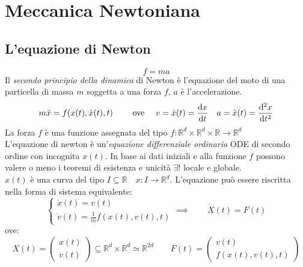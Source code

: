 \section{Meccanica Newtoniana}
\subsection{L'equazione di Newton}
\begin{equation}
    f = m a 
\end{equation}
Il \textit{secondo principio della dinamica} di Newton è l'equazione del moto di una particella di massa $m$ 
soggetta a una forza $f$, $a$ è l'accelerazione.\\ 
\begin{equation}
    m \ddot{x} = f( x(t),\dot{x}(t), t) \qquad \text{ ove } \quad v = \dot{x}(t) = \dv{x}{t}\quad a = \ddot{x}(t)= \dv[2]{x}{t}
\end{equation}
La forza $f$ è una funzione assegnata del tipo $f: \mathbb{R}^d\times \mathbb{R}^d \times \mathbb{R} \rightarrow \mathbb{R}^d$\\
L'equazione di newton è un'\textit{equazione differenziale ordinaria} ODE di secondo ordine con incognita $x(t)$. 
In base ai dati iniziali e alla funzione $f$ possono valere o meno i teoremi di esistenza e unicità $\exists!$ locale e globale.\\ 
$x(t)$ è una curva del tipo $I \subseteq \mathbb{R}\quad x: I \rightarrow \mathbb{R}^d $. L'equazione può essere 
riscritta nella forma di sistema equivalente:
\begin{equation}
    \begin{cases}
        \dot{x}(t) = v(t)\\ 
        \dot{v}(t) =\frac{1}{m} f( x(t), v(t), t)
    \end{cases}
    \implies
    \qquad
    \dot{X}(t)= F(t)
\end{equation}
ove:
\begin{equation*}
    X (t) = \begin{pmatrix}
        x (t) \\ 
        v (t)
    \end{pmatrix} \subseteq \mathbb{R}^d \times \mathbb{R}^d \simeq \mathbb{R}^{2d} \qquad
    F (t) = \begin{pmatrix}
        v(t) \\
        f(x(t), v(t),t)
    \end{pmatrix}
\end{equation*}

